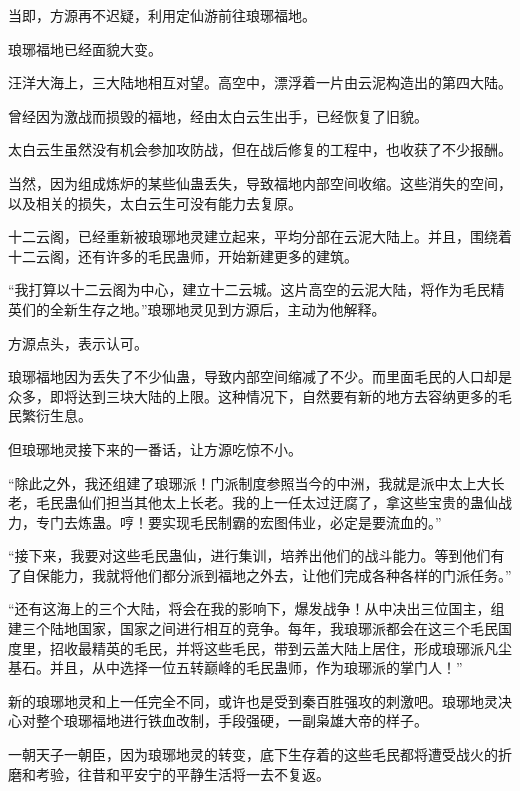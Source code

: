 
\begin{this_body}

当即，方源再不迟疑，利用定仙游前往琅琊福地。

琅琊福地已经面貌大变。

汪洋大海上，三大陆地相互对望。高空中，漂浮着一片由云泥构造出的第四大陆。

曾经因为激战而损毁的福地，经由太白云生出手，已经恢复了旧貌。

太白云生虽然没有机会参加攻防战，但在战后修复的工程中，也收获了不少报酬。

当然，因为组成炼炉的某些仙蛊丢失，导致福地内部空间收缩。这些消失的空间，以及相关的损失，太白云生可没有能力去复原。

十二云阁，已经重新被琅琊地灵建立起来，平均分部在云泥大陆上。并且，围绕着十二云阁，还有许多的毛民蛊师，开始新建更多的建筑。

“我打算以十二云阁为中心，建立十二云城。这片高空的云泥大陆，将作为毛民精英们的全新生存之地。”琅琊地灵见到方源后，主动为他解释。

方源点头，表示认可。

琅琊福地因为丢失了不少仙蛊，导致内部空间缩减了不少。而里面毛民的人口却是众多，即将达到三块大陆的上限。这种情况下，自然要有新的地方去容纳更多的毛民繁衍生息。

但琅琊地灵接下来的一番话，让方源吃惊不小。

“除此之外，我还组建了琅琊派！门派制度参照当今的中洲，我就是派中太上大长老，毛民蛊仙们担当其他太上长老。我的上一任太过迂腐了，拿这些宝贵的蛊仙战力，专门去炼蛊。哼！要实现毛民制霸的宏图伟业，必定是要流血的。”

“接下来，我要对这些毛民蛊仙，进行集训，培养出他们的战斗能力。等到他们有了自保能力，我就将他们都分派到福地之外去，让他们完成各种各样的门派任务。”

“还有这海上的三个大陆，将会在我的影响下，爆发战争！从中决出三位国主，组建三个陆地国家，国家之间进行相互的竞争。每年，我琅琊派都会在这三个毛民国度里，招收最精英的毛民，并将这些毛民，带到云盖大陆上居住，形成琅琊派凡尘基石。并且，从中选择一位五转巅峰的毛民蛊师，作为琅琊派的掌门人！”

新的琅琊地灵和上一任完全不同，或许也是受到秦百胜强攻的刺激吧。琅琊地灵决心对整个琅琊福地进行铁血改制，手段强硬，一副枭雄大帝的样子。

一朝天子一朝臣，因为琅琊地灵的转变，底下生存着的这些毛民都将遭受战火的折磨和考验，往昔和平安宁的平静生活将一去不复返。


\end{this_body}
